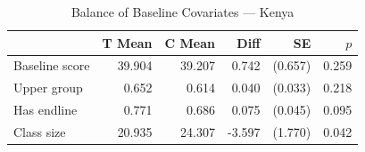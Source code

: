 \begin{table}[htbp]
\centering
\small
\caption{Balance of Baseline Covariates --- Kenya}
\label{tab:ke_balance}
\begin{tabular}{l*{5}{r}}
\toprule
 & T Mean & C Mean & Diff & SE & $p$ \\
\midrule
Baseline score & 39.904 & 39.207 & 0.742 & (0.657) & 0.259 \\
Upper group & 0.652 & 0.614 & 0.040 & (0.033) & 0.218 \\
Has endline & 0.771 & 0.686 & 0.075 & (0.045) & 0.095 \\
Class size & 20.935 & 24.307 & -3.597 & (1.770) & 0.042 \\
\bottomrule
\end{tabular}
\par\smallskip{}
\end{table}